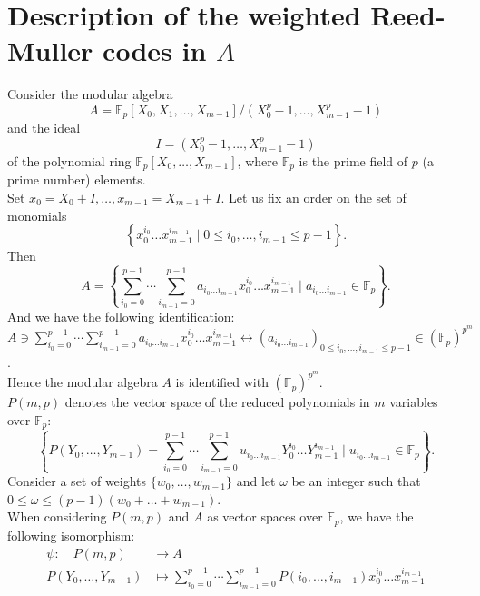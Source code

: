 \documentclass{article}
\theoremstyle{plain}
\theoremstyle{definition}
\begin{document}
\section{Description of the weighted Reed-Muller codes in $A$}
Consider the modular algebra
\begin{equation*}
A=\mathbb{F}_{p}[X_{0},X_{1},\ldots ,X_{m-1}]/(X_{0}^{p}-1,\ldots ,X_{m-1}^{p}-1)
\end{equation*}
and the ideal
\begin{equation*}
I=\left(X_{0}^{p}-1,\ldots,X_{m-1}^{p}-1\right)
\end{equation*}
of the polynomial ring $\mathbb{F}_{p}[X_{0},\ldots,X_{m-1}]$, where $\mathbb{F}_{p}$ is the prime field of $p$ (a prime number) elements.\\
Set $x_0=X_0+I,\ldots,x_{m-1}=X_{m-1}+I$.
Let us fix an order on the set of monomials
\begin{equation*}
\left\{x_{0}^{i_0}\ldots x_{m-1}^{i_{m-1}} \mid 0\leq i_{0},\ldots,i_{m-1}\leq p-1\right\}.
\end{equation*}
Then
\begin{equation}
A=\left\{\sum_{i_{0}=0}^{p-1}\cdots\sum_{i_{m-1}=0}^{p-1}a_{i_{0}\ldots i_{m-1}}x_{0}^{i_0}\ldots x_{m-1}^{i_{m-1}} \mid a_{i_0\ldots i_{m-1}}\in \mathbb{F}_{p}\right\}.
\end{equation}
And we have the following identification:\\
$A\ni\sum_{i_0=0}^{p-1}\cdots\sum_{i_{m-1}=0}^{p-1}a_{i_0\ldots i_{m-1}}x_0^{i_0}\ldots x_{m-1}^{i_{m-1}} \longleftrightarrow (a_{i_0\ldots i_{m-1}})_{0\leq i_{0},\ldots,i_{m-1}\leq p-1}\in \left(\mathbb{F}_{p}\right)^{p^m}$.\\
Hence the modular algebra $A$ is identified with $\left(\mathbb{F}_{p}\right)^{p^m}$.\\
$P(m,p)$ denotes the vector space of the reduced polynomials in $m$ variables over $\mathbb{F}_{p}$:
\begin{equation*}\label{redpoly}
\left\{P(Y_{0},\ldots,Y_{m-1})=\sum_{i_{0}=0}^{p-1}\cdots\sum_{i_{m-1}=0}^{p-1}u_{i_0\ldots i_{m-1}}Y_0^{i_0}\ldots Y_{m-1}^{i_{m-1}} \mid u_{i_0\ldots i_{m-1}}\in \mathbb{F}_{p}\right\}.
\end{equation*}
Consider  a set of weights $\{w_{0},\ldots ,w_{m-1}\}$ and let $\omega$ be an integer such that $0\leq\omega\leq (p-1)(w_{0}+\ldots +w_{m-1})$.\\
When considering $P(m,p)$ and $A$ as vector spaces over $\mathbb{F}_{p}$, we have the following isomorphism:
\begin{equation}\label{isom}
\begin{aligned}
\psi :\quad  P(m,p)&\longrightarrow A \\
        P(Y_{0},\ldots,Y_{m-1}) &\longmapsto \sum_{i_0=0}^{p-1}\cdots\sum_{i_{m-1}=0}^{p-1}P(i_0,\ldots ,i_{m-1})x_0^{i_0}\ldots x_{m-1}^{i_{m-1}}
\end{aligned}
\end{equation}
\end{document}
